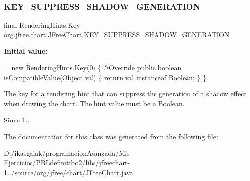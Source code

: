 \subsubsection{\texorpdfstring{K\+E\+Y\+\_\+\+S\+U\+P\+P\+R\+E\+S\+S\+\_\+\+S\+H\+A\+D\+O\+W\+\_\+\+G\+E\+N\+E\+R\+A\+T\+I\+ON}{KEY\_SUPPRESS\_SHADOW\_GENERATION}}
{\footnotesize\ttfamily final Rendering\+Hints.\+Key org.\+jfree.\+chart.\+J\+Free\+Chart.\+K\+E\+Y\+\_\+\+S\+U\+P\+P\+R\+E\+S\+S\+\_\+\+S\+H\+A\+D\+O\+W\+\_\+\+G\+E\+N\+E\+R\+A\+T\+I\+ON\hspace{0.3cm}{\ttfamily [static]}}

{\bfseries Initial value\+:}
\begin{DoxyCode}
= \textcolor{keyword}{new} RenderingHints.Key(0) \{
        @Override
        \textcolor{keyword}{public} \textcolor{keywordtype}{boolean} isCompatibleValue(Object val) \{
            \textcolor{keywordflow}{return} val instanceof Boolean;
        \}
    \}
\end{DoxyCode}
The key for a rendering hint that can suppress the generation of a shadow effect when drawing the chart. The hint value must be a Boolean.

\begin{DoxySince}{Since}
1.. 
\end{DoxySince}


The documentation for this class was generated from the following file\+:\begin{DoxyCompactItemize}
\item 
D\+:/ikasgaiak/programacion\+Avanzada/\+Mis Ejercicios/\+P\+B\+Ldefinitibo2/libs/jfreechart-\/1../source/org/jfree/chart/\mbox{\hyperlink{_j_free_chart_8java}{J\+Free\+Chart.\+java}}\end{DoxyCompactItemize}
